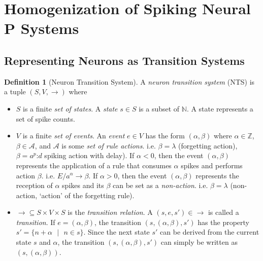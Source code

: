 \documentclass[]{elsarticle}
\theoremstyle{definition}
\newtheorem{definition2}{Definition}
\theoremstyle{definition}
\newcommand{\ra}{\rightarrow}
\newcommand{\se}{\text{ }}
\newcommand{\sm}{\text{:}}
\begin{document}
\section{Homogenization of Spiking Neural P Systems} \label{sec-homo}


\subsection{Representing Neurons as Transition Systems}\label{sec-homo-sm}



\begin{definition2}[Neuron Transition System] \label{def-nts}
A \emph{neuron transition system} (NTS) is a tuple $(S,V, \ra)$ where
\begin{itemize}
   \item $S$ is a finite \emph{set of states}. A \emph{state} $s \in S$ is a subset of $\mathbb{N}$.
         A state represents a set of spike counts.
   \item $V$ is a finite \emph{set of events}. An \emph{event} $e\in V$ has the form $(\alpha,\beta)$
         where $\alpha \in \mathbb{Z}$, $\beta \in \mathcal{A}$, and $\mathcal{A}$ is some 
         \emph{set of rule actions}. i.e. $\beta=\lambda$ (forgetting action), $\beta=a^p\sm d$ 
         spiking action with delay). If $\alpha < 0$, then the event $(\alpha,\beta)$ represents the
         application of a rule that consumes $\alpha$ spikes and performs action $\beta$. i.e. 
         $E/a^{\alpha} \ra \beta$. If $\alpha > 0$, then the event $(\alpha,\beta)$ represents the
         reception of $\alpha$ spikes and its $\beta$ can be set as a \emph{non-action}. i.e. 
         $\beta = \lambda$ (non-action, `action' of the forgetting rule). 
   \item $\ra \subseteq S \times V \times S$ is the \emph{transition relation}. A $(s,e,s')\in 
         \ra$ is called a \emph{transition}. If $e=(\alpha,\beta)$, the transition $(s,(\alpha,
         \beta),s')$ has the property $s'=\{n+\alpha\se|\se n \in s\}$. Since the next state $s'$
         can be derived from the current state $s$ and $\alpha$, the transition 
         $(s,(\alpha,\beta),s')$ can simply be written as $(s,(\alpha,\beta))$.
\end{itemize} 
\end{definition2}
\end{document}
